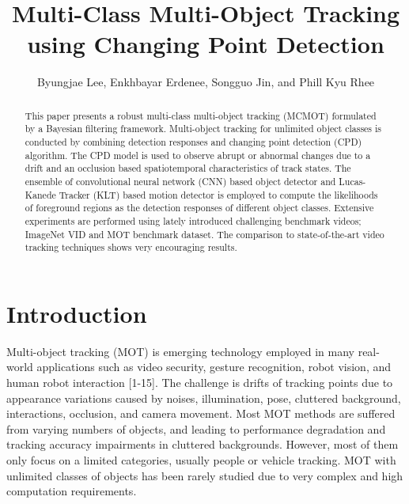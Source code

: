 \documentclass[runningheads]{llncs}
\begin{document}
\pagestyle{headings}
\mainmatter

\title{Multi-Class Multi-Object Tracking using Changing Point Detection} 



\author{Byungjae Lee, Enkhbayar Erdenee, Songguo Jin, and Phill Kyu Rhee}






\maketitle

\begin{abstract}
This paper presents a robust multi-class multi-object tracking (MCMOT) formulated by a Bayesian filtering framework. Multi-object tracking for unlimited object classes is conducted by combining detection responses and changing  point detection (CPD) algorithm. The CPD model is used to observe abrupt or abnormal changes due to a drift and an occlusion based spatiotemporal characteristics of track states. The ensemble of convolutional neural network (CNN) based object detector and Lucas-Kanede Tracker (KLT) based motion detector is employed to compute the likelihoods of foreground regions as the detection responses of different object classes. Extensive experiments are performed using lately introduced challenging benchmark videos; ImageNet VID and MOT benchmark dataset. The comparison to state-of-the-art video tracking techniques shows very encouraging results. 

\end{abstract}


\section{Introduction}

Multi-object tracking (MOT) is emerging technology employed in many real-world applications such as video security, gesture recognition, robot vision, and human robot interaction [1-15]. The challenge is drifts of tracking points due to appearance variations caused by noises, illumination, pose, cluttered background, interactions, occlusion, and camera movement. Most MOT methods are suffered from varying numbers of objects, and leading to performance degradation and tracking accuracy impairments in cluttered backgrounds. However, most of them only focus on a limited categories, usually people or vehicle tracking. MOT with unlimited classes of objects has been rarely studied due to very complex and high computation requirements.
\end{document}

